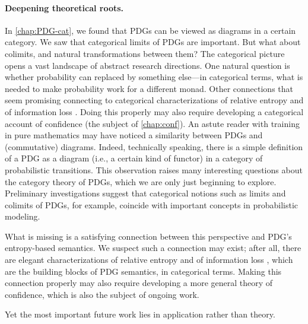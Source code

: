 \paragraph{Deepening theoretical roots.}
% 
\iffoundations
    In \cref{chap:PDG-cat}, we found that PDGs can be viewed as diagrams in a certain category. 
    We saw that categorical limits of PDGs are important. But what about colimits, and natural transformations between them? 
    The categorical picture opens a vast landscape of abstract research directions.
    One natural question is whether probability can replaced by something else---in categorical terms, what is needed to make probability work for a different monad.
    Other connections that seem promising connecting to categorical characterizations of relative entropy \citep{baez2014bayesiancharacterizationrelativeentropy} 
    and of information loss \citep[Theorem 12.4.9]{leinster2021entropy}.
    Doing this properly may also require developing a categorical account of confidence (the subject of \cref{chap:conf}). 
\else
    An astute reader with training in pure mathematics may have noticed a similarity between PDGs and (commutative) diagrams.
    Indeed, technically speaking, there is a simple definition of a PDG as a diagram (i.e., a certain kind of functor) in a category of probabilistic transitions. 
    This observation raises many interesting questions about the category theory of PDGs, which we are only just beginning to explore.
    Preliminary investigations suggest that categorical notions such as limits and colimits of PDGs, for example, coincide with important concepts in probabilistic modeling. 
    
    What is missing is a satisfying connection between this perspective and PDG's entropy-based semantics.
    We suspect such a connection may exist; after all, there are elegant characterizations of relative entropy \citep{baez2014bayesiancharacterizationrelativeentropy} 
        and of information loss \citep[Theorem 12.4.9]{leinster2021entropy}, which are the building blocks of PDG semantics, in categorical terms. 
    Making this connection properly may also require developing a more general theory of confidence, which is also the subject of ongoing work. 
\fi

Yet the most important future work lies in application rather than theory.

